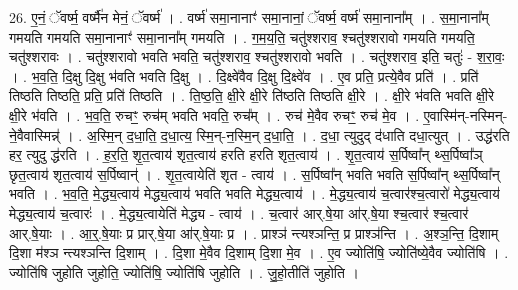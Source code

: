 \documentclass[17pt]{extarticle}
\begin{document}
26. ए॒नं॒ ॅवर्ष्म॒ वर्ष्मै॑न मेनं॒ ॅवर्ष्म॑ । . वर्ष्म॑ समा॒नानाꣳ॑ समा॒नानां॒ ॅवर्ष्म॒ वर्ष्म॑ समा॒नाना᳚म् । . स॒मा॒नाना᳚म् गमयति गमयति समा॒नानाꣳ॑ समा॒नाना᳚म् गमयति । . ग॒म॒य॒ति॒ चतु॑श्शराव॒ श्चतु॑श्शरावो गमयति गमयति॒ चतु॑श्शरावः । . चतु॑श्शरावो भवति भवति॒ चतु॑श्शराव॒ श्चतु॑श्शरावो भवति । . चतु॑श्शराव॒ इति॒ चतुः॑ - श॒रा॒वः॒ । . भ॒व॒ति॒ दि॒क्षु दि॒क्षु भ॑वति भवति दि॒क्षु । . दि॒क्ष्वे॑वैव दि॒क्षु दि॒क्ष्वे॑व । . ए॒व प्रति॒ प्रत्ये॒वैव प्रति॑ । . प्रति॑ तिष्ठति तिष्ठति॒ प्रति॒ प्रति॑ तिष्ठति । . ति॒ष्ठ॒ति॒ क्षी॒रे क्षी॒रे ति॑ष्ठति तिष्ठति क्षी॒रे । . क्षी॒रे भ॑वति भवति क्षी॒रे क्षी॒रे भ॑वति । . भ॒व॒ति॒ रुचꣳ॒॒ रुच॑म् भवति भवति॒ रुच᳚म् । . रुच॑ मे॒वैव रुचꣳ॒॒ रुच॑ मे॒व । . ए॒वास्मि॑न्-नस्मिन्-ने॒वैवास्मिन्न्॑ । . अ॒स्मि॒न् द॒धा॒ति॒ द॒धा॒त्य॒ स्मि॒न्-न॒स्मि॒न् द॒धा॒ति॒ । . द॒धा॒ त्युदुद् द॑धाति दधा॒त्युत् । . उद्ध॑रति हर॒ त्युदु द्ध॑रति । . ह॒र॒ति॒ शृ॒त॒त्वाय॑ शृत॒त्वाय॑ हरति हरति शृत॒त्वाय॑ । . शृ॒त॒त्वाय॑ स॒र्पिष्वा᳚न् थ्स॒र्पिष्वा᳚ञ् छृत॒त्वाय॑ शृत॒त्वाय॑ स॒र्पिष्वान्॑ । . शृ॒त॒त्वायेति॑ शृत - त्वाय॑ । . स॒र्पिष्वा᳚न् भवति भवति स॒र्पिष्वा᳚न् थ्स॒र्पिष्वा᳚न् भवति । . भ॒व॒ति॒ मे॒द्ध्य॒त्वाय॑ मेद्ध्य॒त्वाय॑ भवति भवति मेद्ध्य॒त्वाय॑ । . मे॒द्ध्य॒त्वाय॑ च॒त्वार॑श्च॒त्वारो॑ मेद्ध्य॒त्वाय॑ मेद्ध्य॒त्वाय॑ च॒त्वारः॑ । . मे॒द्ध्य॒त्वायेति॑ मेद्ध्य - त्वाय॑ । . च॒त्वार॑ आर्.षे॒या आ॑र्.षे॒या श्च॒त्वार॑ श्च॒त्वार॑ आर्.षे॒याः । . आ॒र्॒.षे॒याः प्र प्रार्.षे॒या आ॑र्.षे॒याः प्र । . प्राश्ञ॑ न्त्यश्ञन्ति॒ प्र प्राश्ञ॑न्ति । . अ॒श्ञ॒न्ति॒ दि॒शाम् दि॒शा म॑श्ञ न्त्यश्ञन्ति दि॒शाम् । . दि॒शा मे॒वैव दि॒शाम् दि॒शा मे॒व । . ए॒व ज्योति॑षि॒ ज्योति॑ष्ये॒वैव ज्योति॑षि । . ज्योति॑षि जुहोति जुहोति॒ ज्योति॑षि॒ ज्योति॑षि जुहोति । . जु॒हो॒तीति॑ जुहोति । \newline
\end{document}
